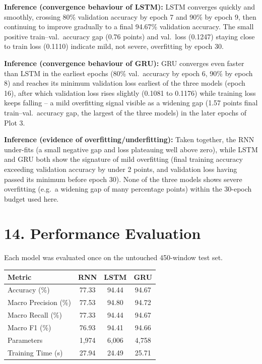 \documentclass[10pt]{article}
\begin{document}
\textbf{Inference (convergence behaviour of LSTM):} LSTM converges quickly
and smoothly, crossing 80\% validation accuracy by epoch 7 and 90\% by
epoch 9, then continuing to improve gradually to a final 94.67\% validation
accuracy. The small positive train--val.\ accuracy gap (0.76 points) and
val.\ loss (0.1247) staying close to train loss (0.1110) indicate mild,
not severe, overfitting by epoch 30.

\textbf{Inference (convergence behaviour of GRU):} GRU converges even
faster than LSTM in the earliest epochs (80\% val.\ accuracy by epoch 6, 90\%
by epoch 8) and reaches its minimum validation loss earliest of the three
models (epoch 16), after which validation loss rises slightly (0.1081 to
0.1176) while training loss keeps falling -- a mild overfitting signal
visible as a widening gap (1.57 points final train--val.\ accuracy gap, the
largest of the three models) in the later epochs of Plot 3.

\textbf{Inference (evidence of overfitting/underfitting):} Taken together,
the RNN under-fits (a small negative gap and loss plateauing well above
zero), while LSTM and GRU both show the signature of mild overfitting
(final training accuracy exceeding validation accuracy by under 2 points,
and validation loss having passed its minimum before epoch 30). None of the
three models shows severe overfitting (e.g.\ a widening gap of many
percentage points) within the 30-epoch budget used here.

\section*{14. Performance Evaluation}

Each model was evaluated once on the untouched 450-window test set.

\begin{center}
\begin{tabular}{|l|c|c|c|}
\hline
Metric & RNN & LSTM & GRU\\
\hline
Accuracy (\%) & 77.33 & 94.44 & 94.67\\
Macro Precision (\%) & 77.53 & 94.80 & 94.72\\
Macro Recall (\%) & 77.33 & 94.44 & 94.67\\
Macro F1 (\%) & 76.93 & 94.41 & 94.66\\
Parameters & 1{,}974 & 6{,}006 & 4{,}758\\
Training Time (s) & 27.94 & 24.49 & 25.71\\
\hline
\end{tabular}
\end{center}
\end{document}
